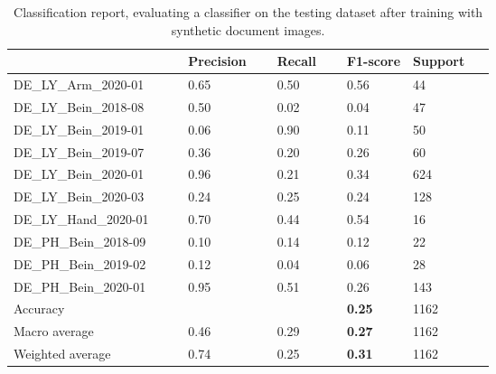 \begin{center}
\begin{table}[H]
    \centering
    \begin{center}
    \begin{tabular}{P{0.22\linewidth} P{0.10\linewidth} P{0.10\linewidth} P{0.10\linewidth} P{0.10\linewidth}} 
        \toprule
            & Precision & Recall & F1-score & Support\\[0.0ex] 
        \midrule
        DE\_LY\_Arm\_2020-01 & 0.65 & 0.50 & 0.56 & 44\\[0.0ex]
        \midrule
        DE\_LY\_Bein\_2018-08 & 0.50 & 0.02 & 0.04 & 47\\[0.0ex]
        \midrule
        DE\_LY\_Bein\_2019-01 & 0.06 & 0.90 & 0.11 & 50\\[0.0ex]
        \midrule
        DE\_LY\_Bein\_2019-07 & 0.36 & 0.20 & 0.26 & 60\\[0.0ex]
        \midrule
        DE\_LY\_Bein\_2020-01 & 0.96 & 0.21 & 0.34 & 624\\[0.0ex]
        \midrule
        DE\_LY\_Bein\_2020-03 & 0.24 & 0.25 & 0.24 & 128\\[0.0ex]
        \midrule
        DE\_LY\_Hand\_2020-01 & 0.70 & 0.44 & 0.54 & 16\\[0.0ex]
        \midrule
        DE\_PH\_Bein\_2018-09 & 0.10 & 0.14 & 0.12 & 22\\[0.0ex]
        \midrule
        DE\_PH\_Bein\_2019-02 & 0.12 & 0.04 & 0.06 & 28\\[0.0ex]
        \midrule
        DE\_PH\_Bein\_2020-01 & 0.95 & 0.51 & 0.26 & 143\\[0.0ex]
        \midrule
        \midrule
        Accuracy              &      &      & \bf{0.25} & 1162\\[0.0ex]
        Macro average             & 0.46 & 0.29 &  \bf{0.27} & 1162\\[0.0ex]
        Weighted average          & 0.74 & 0.25 &  \bf{0.31} & 1162\\[0.0ex]
        \bottomrule
    \end{tabular}
    \caption[Classification report, evaluating a classifier on the testing dataset after training with synthetic document images.]{Classification report, evaluating a classifier on the testing dataset after training with synthetic document images.}
    \label{table:SyntheticClassificationReport}
    \end{center}
\end{table}
\end{center}



